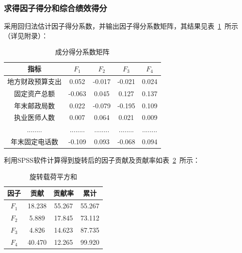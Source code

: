\documentclass{whutmod}
\begin{document}
	\subsubsection{求得因子得分和综合绩效得分}
	采用回归法估计因子得分系数，并输出因子得分系数矩阵，其结果见表~\ref{defenyinzi}~所示（详见附录）：
				\begin{table}[H]
		\centering
		\caption{成分得分系数矩阵}\label{defenyinzi}
		\begin{tabular}{ccccc}
			\toprule[2pt]
			\multicolumn{1}{m{2cm}}{\centering 指标} &
			\multicolumn{1}{m{1cm}}{\centering $F_{1}$} & \multicolumn{1}{m{1cm}}{\centering $F_{2}$} & \multicolumn{1}{m{1cm}}{\centering $F_{3}$}&
			\multicolumn{1}{m{1cm}}{\centering $F_{4}$}\\
			\midrule[1pt]
			地方财政预算支出&0.052 & -0.017 & -0.021&0.024\\ 
			固定资产总额&-0.063 & 0.045 &0.127&0.137\\ 
			年末邮政局数&0.022 &-0.079  &-0.195&0.109\\ 
			执业医师人数&0.007 &0.064 &0.021 &0.009\\ 
			........& ........&  ........ &........ &........ \\ 
			年末固定电话数&-0.109 &0.093 &-0.068 &0.094 \\
			\bottomrule[2pt]
		\end{tabular}
	\end{table}
	
	利用SPSS软件计算得到旋转后的因子贡献及贡献率如表~\ref{fff}~所示：
			\begin{table}[H]
	\centering
	\caption{旋转载荷平方和}\label{fff}
	\begin{tabular}{cccc}
		\toprule[2pt]
		\multicolumn{1}{m{2cm}}{\centering 因子}&
		\multicolumn{1}{m{2cm}}{\centering 贡献} & \multicolumn{1}{m{2cm}}{\centering 贡献率} & \multicolumn{1}{m{2cm}}{\centering 累计}\\
		\midrule[1pt]
		$F_{1}$	 &  18.238 & 55.267&55.267\\ 
		$F_{2}$ &  5.889 & 17.845&73.112\\ 
		$F_{3}$	 &  4.826 &14.623&87.735\\ 
		$F_{4}$  &  40.470& 12.265&99.920\\ 
		\bottomrule[2pt]
	\end{tabular}
\end{table}
	
\end{document}
